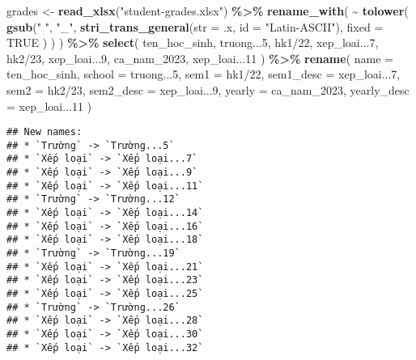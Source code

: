 \documentclass[
]{article}
\newenvironment{Shaded}{\begin{snugshade}}{\end{snugshade}}
\newcommand{\AttributeTok}[1]{\textcolor[rgb]{0.13,0.29,0.53}{#1}}
\newcommand{\ConstantTok}[1]{\textcolor[rgb]{0.56,0.35,0.01}{#1}}
\newcommand{\FunctionTok}[1]{\textcolor[rgb]{0.13,0.29,0.53}{\textbf{#1}}}
\newcommand{\NormalTok}[1]{#1}
\newcommand{\OtherTok}[1]{\textcolor[rgb]{0.56,0.35,0.01}{#1}}
\newcommand{\SpecialCharTok}[1]{\textcolor[rgb]{0.81,0.36,0.00}{\textbf{#1}}}
\newcommand{\StringTok}[1]{\textcolor[rgb]{0.31,0.60,0.02}{#1}}
\begin{document}
\begin{Shaded}
\begin{Highlighting}[]
\NormalTok{grades }\OtherTok{\textless{}{-}} \FunctionTok{read\_xlsx}\NormalTok{(}\StringTok{"student{-}grades.xlsx"}\NormalTok{) }\SpecialCharTok{\%\textgreater{}\%}
  \FunctionTok{rename\_with}\NormalTok{(}
    \SpecialCharTok{\textasciitilde{}} \FunctionTok{tolower}\NormalTok{(}
      \FunctionTok{gsub}\NormalTok{(}\StringTok{" "}\NormalTok{, }\StringTok{"\_"}\NormalTok{,}
        \FunctionTok{stri\_trans\_general}\NormalTok{(}\AttributeTok{str =}\NormalTok{ .x, }\AttributeTok{id =} \StringTok{"Latin{-}ASCII"}\NormalTok{),}
        \AttributeTok{fixed =} \ConstantTok{TRUE}
\NormalTok{      )}
\NormalTok{    )}
\NormalTok{  ) }\SpecialCharTok{\%\textgreater{}\%}
  \FunctionTok{select}\NormalTok{(}
\NormalTok{    ten\_hoc\_sinh, }\StringTok{\textasciigrave{}}\AttributeTok{truong...5}\StringTok{\textasciigrave{}}\NormalTok{, }\StringTok{\textasciigrave{}}\AttributeTok{hk1/22}\StringTok{\textasciigrave{}}\NormalTok{, }\StringTok{\textasciigrave{}}\AttributeTok{xep\_loai...7}\StringTok{\textasciigrave{}}\NormalTok{, }\StringTok{\textasciigrave{}}\AttributeTok{hk2/23}\StringTok{\textasciigrave{}}\NormalTok{,}
    \StringTok{\textasciigrave{}}\AttributeTok{xep\_loai...9}\StringTok{\textasciigrave{}}\NormalTok{, ca\_nam\_2023, }\StringTok{\textasciigrave{}}\AttributeTok{xep\_loai...11}\StringTok{\textasciigrave{}}
\NormalTok{  ) }\SpecialCharTok{\%\textgreater{}\%}
  \FunctionTok{rename}\NormalTok{(}
    \AttributeTok{name =}\NormalTok{ ten\_hoc\_sinh,}
    \AttributeTok{school =} \StringTok{\textasciigrave{}}\AttributeTok{truong...5}\StringTok{\textasciigrave{}}\NormalTok{,}
    \AttributeTok{sem1 =} \StringTok{\textasciigrave{}}\AttributeTok{hk1/22}\StringTok{\textasciigrave{}}\NormalTok{,}
    \AttributeTok{sem1\_desc =} \StringTok{\textasciigrave{}}\AttributeTok{xep\_loai...7}\StringTok{\textasciigrave{}}\NormalTok{,}
    \AttributeTok{sem2 =} \StringTok{\textasciigrave{}}\AttributeTok{hk2/23}\StringTok{\textasciigrave{}}\NormalTok{,}
    \AttributeTok{sem2\_desc =} \StringTok{\textasciigrave{}}\AttributeTok{xep\_loai...9}\StringTok{\textasciigrave{}}\NormalTok{,}
    \AttributeTok{yearly =}\NormalTok{ ca\_nam\_2023,}
    \AttributeTok{yearly\_desc =} \StringTok{\textasciigrave{}}\AttributeTok{xep\_loai...11}\StringTok{\textasciigrave{}}
\NormalTok{  )}
\end{Highlighting}
\end{Shaded}

\begin{verbatim}
## New names:
## * `Trường` -> `Trường...5`
## * `Xếp loại` -> `Xếp loại...7`
## * `Xếp loại` -> `Xếp loại...9`
## * `Xếp loại` -> `Xếp loại...11`
## * `Trường` -> `Trường...12`
## * `Xếp loại` -> `Xếp loại...14`
## * `Xếp loại` -> `Xếp loại...16`
## * `Xếp loại` -> `Xếp loại...18`
## * `Trường` -> `Trường...19`
## * `Xếp loại` -> `Xếp loại...21`
## * `Xếp loại` -> `Xếp loại...23`
## * `Xếp loại` -> `Xếp loại...25`
## * `Trường` -> `Trường...26`
## * `Xếp loại` -> `Xếp loại...28`
## * `Xếp loại` -> `Xếp loại...30`
## * `Xếp loại` -> `Xếp loại...32`
\end{verbatim}
\end{document}
